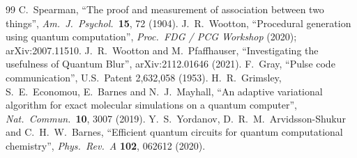 \documentclass[10pt,a4paper]{article}
\begin{document}
\begin{thebibliography}{99}
 C.~Spearman, ``The proof and measurement of association between two things'', \emph{Am.\ J.\ Psychol.}\ \textbf{15}, 72 (1904).
 J.~R.~Wootton, ``Procedural generation using quantum computation'', \emph{Proc.\ FDG / PCG Workshop} (2020); arXiv:2007.11510.
 J.~R.~Wootton and M.~Pfaffhauser, ``Investigating the usefulness of Quantum Blur'', arXiv:2112.01646 (2021).
 F.~Gray, ``Pulse code communication'', U.S.\ Patent 2,632,058 (1953).
 H.~R.~Grimsley, S.~E.~Economou, E.~Barnes and N.~J.~Mayhall, ``An adaptive variational algorithm for exact molecular simulations on a quantum computer'', \emph{Nat.\ Commun.}\ \textbf{10}, 3007 (2019).
 Y.~S.~Yordanov, D.~R.~M.~Arvidsson-Shukur and C.~H.~W.~Barnes, ``Efficient quantum circuits for quantum computational chemistry'', \emph{Phys.\ Rev.\ A} \textbf{102}, 062612 (2020).
\end{thebibliography}
\end{document}
